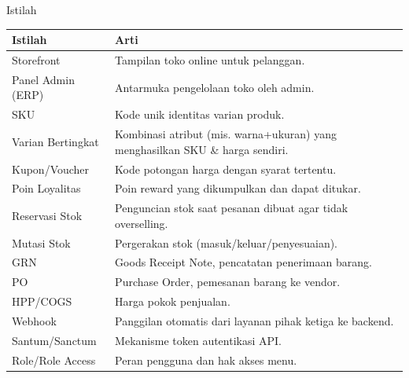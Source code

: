 
\begin{flowsection}{Istilah}
\begin{center}
\renewcommand{\arraystretch}{1.3}
\begin{tabular}{|p{4.2cm}|p{9.8cm}|}
\hline
\textbf{Istilah} & \textbf{Arti} \\ \hline
Storefront & Tampilan toko online untuk pelanggan. \\ \hline
Panel Admin (ERP) & Antarmuka pengelolaan toko oleh admin. \\ \hline
SKU & Kode unik identitas varian produk. \\ \hline
Varian Bertingkat & Kombinasi atribut (mis. warna+ukuran) yang menghasilkan SKU \& harga sendiri. \\ \hline
Kupon/Voucher & Kode potongan harga dengan syarat tertentu. \\ \hline
Poin Loyalitas & Poin reward yang dikumpulkan dan dapat ditukar. \\ \hline
Reservasi Stok & Penguncian stok saat pesanan dibuat agar tidak overselling. \\ \hline
Mutasi Stok & Pergerakan stok (masuk/keluar/penyesuaian). \\ \hline
GRN & Goods Receipt Note, pencatatan penerimaan barang. \\ \hline
PO & Purchase Order, pemesanan barang ke vendor. \\ \hline
HPP/COGS & Harga pokok penjualan. \\ \hline
Webhook & Panggilan otomatis dari layanan pihak ketiga ke backend. \\ \hline
Santum/Sanctum & Mekanisme token autentikasi API. \\ \hline
Role/Role Access & Peran pengguna dan hak akses menu. \\ \hline
\end{tabular}
\end{center}
\end{flowsection}

